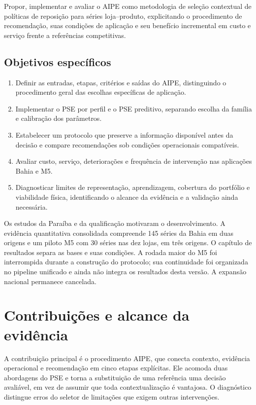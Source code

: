 Propor, implementar e avaliar o AIPE como metodologia de seleção contextual de políticas de reposição para séries loja--produto, explicitando o procedimento de recomendação, suas condições de aplicação e seu benefício incremental em custo e serviço frente a referências competitivas.

\subsection*{Objetivos específicos}

\begin{enumerate}
  \item Definir as entradas, etapas, critérios e saídas do AIPE, distinguindo o procedimento geral das escolhas específicas de aplicação.
  \item Implementar o PSE por perfil e o PSE preditivo, separando escolha da família e calibração dos parâmetros.
  \item Estabelecer um protocolo que preserve a informação disponível antes da decisão e compare recomendações sob condições operacionais compatíveis.
  \item Avaliar custo, serviço, deteriorações e frequência de intervenção nas aplicações Bahia e M5.
  \item Diagnosticar limites de representação, aprendizagem, cobertura do portfólio e viabilidade física, identificando o alcance da evidência e a validação ainda necessária.
\end{enumerate}

Os estudos da Paraíba e da qualificação motivaram o desenvolvimento. A evidência quantitativa consolidada compreende 145 séries da Bahia em duas origens e um piloto M5 com 30 séries nas dez lojas, em três origens. O capítulo de resultados separa as bases e suas condições. A rodada maior do M5 foi interrompida durante a construção do protocolo; sua continuidade foi organizada no pipeline unificado e ainda não integra os resultados desta versão. A expansão nacional permanece cancelada.

\section{Contribuições e alcance da evidência}

A contribuição principal é o procedimento AIPE, que conecta contexto, evidência operacional e recomendação em cinco etapas explícitas. Ele acomoda duas abordagens do PSE e torna a substituição de uma referência uma decisão avaliável, em vez de assumir que toda contextualização é vantajosa. O diagnóstico distingue erros do seletor de limitações que exigem outras intervenções.

